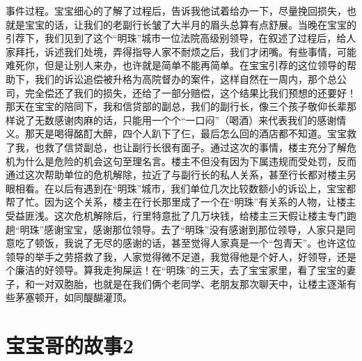 事件过程。宝宝细心的了解了过程后，告诉我他试着给办一下，尽量挽回损失，也就是宝宝的话，让我们的老副行长皱了大半月的眉头总算有点舒展。当晚在宝宝的引荐下，我们见到了这个“明珠”城市一位法院高级别领导，在叙述了过程后，给人家拜托，诉述我们处境，弄得指导人家不耐烦之后，我们才闭嘴。有些事情，可能难死你，但是让别人来办，也许就是简单不能再简单。在宝宝引荐的这位领导的帮助下，我们的诉讼追偿被升格为高院督办的案件，这样自然在一周内，那个总公司，完全偿还了我们的损失，还给了一部分赔偿，这个结果比我们预想的还要好！那天在宝宝的陪同下，我和信贷部的副总，我们的副行长，像三个孩子敬仰长辈那样说了无数感谢肉麻的话，只能用一个个“一口闷”（喝酒）来代表我们的感谢情义。那天是喝得酩酊大醉，四个人趴下了仨，最后怎么回的酒店都不知道。宝宝救了我，也救了信贷副总，也让副行长很有面子。通过这次的事情，楼主充分了解危机为什么是危险的机会这句至理名言。楼主不但没有因为下属违规而受处罚，反而通过这次帮助单位的危机解除，拉近了与副行长的私人关系，甚至行长都对楼主另眼相看。在以后有遇到在“明珠”城市，我们单位几次比较数额小的诉讼上，宝宝都帮了忙。因为这个关系，楼主在行长那里成了一个在“明珠”有关系的人物，让楼主受益匪浅。这次危机解除后，行里特意批了几万块钱，给楼主三天假让楼主专门跑趟“明珠”感谢宝宝，感谢那位领导。去了“明珠”没有感谢到那位领导，人家只是同意吃了顿饭，我说了无尽的感谢的话，甚至觉得人家真是一个“包青天”。也许这位领导的举手之劳搭救了我，人家觉得微不足道，我觉得他是个好人，好领导，还是个廉洁的好领导。算我走狗屎运！在“明珠”的三天，去了宝宝家里，看了宝宝的妻子，和一对双胞胎，也就是在我们俩个老同学、老朋友那次聊天中，让楼主逐渐有些茅塞顿开，如同醍醐灌顶。

\section{宝宝哥的故事2}


